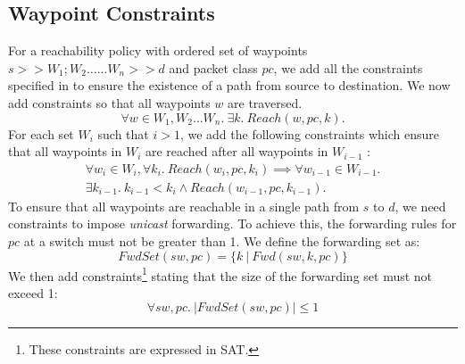 \subsection{Waypoint Constraints} 
For a reachability policy with ordered set of waypoints $s >> W_1;W_2 \ldots ... W_n >> d$ and packet class $pc$, we add all the constraints specified in  to ensure the existence of a path from source to destination. We now add constraints so that all waypoints $w$
are traversed. 
\begin{equation} \label{eq:waypoints}
	\forall w \in W_1, W_2 \ldots W_n. \ \exists k.~Reach(w, pc, k).
\end{equation}
For each set $W_i$  such that $i>1$, we add the following constraints which ensure that all waypoints
in $W_i$ are reached after all waypoints in $W_{i - 1}$ : 
\begin{multline}
\forall w_{i} \in W_{i}, \forall k_i.~Reach(w_i, pc, k_i) \implies 
\forall w_{i - 1} \in W_{i-1}. \\ \exists k_{i-1}. \ 
 k_{i-1} < k_{i} \wedge Reach(w_{i-1}, pc, k_{i-1}).
\end{multline}
To ensure that all waypoints are reachable in a single path from
$s$ to $d$, we need constraints to impose {\em unicast} forwarding. To achieve
this, the forwarding rules for $pc$ at a switch must not be greater than 1. 
We define the forwarding set as:
\begin{equation}
	FwdSet(sw,pc) = \{k \ | \ Fwd(sw,k,pc)\}
\end{equation}
We then add constraints\footnote{
	These constraints are expressed in SAT.} stating that the size of the forwarding set must not exceed 1:
\begin{equation}
		\forall sw,pc .\ |FwdSet(sw,pc)| \leq 1 \label{eq:fwdset}
\end{equation}
